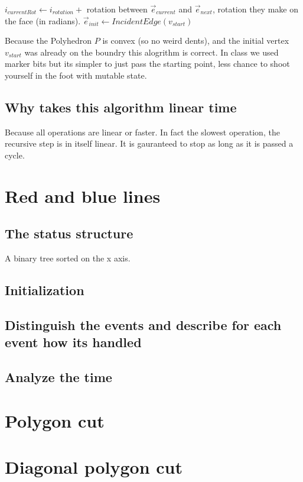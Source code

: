 \documentclass{article}
\begin{document}
\begin{empfile}
\begin{algorithmic}
	\State
	$i_{currentRot} \gets i_{rotation} + $ rotation between 
	$\vec{e}_{current}$ and $\vec{e}_{next}$, rotation they make on the 
	face (in radians).
		\State \Return {}
	\EndIf
	\State
	\Return {}
	\EndFunction
	\State
	\State $\vec{e}_{init} \gets IncidentEdge(v_{start})$
	\State
	\State \Return
	\EndFunction
	\State 
\end{algorithmic}

Because the Polyhedron $P$ is convex (so no weird dents), and
the initial vertex $v_{start}$ was already on the boundry this
alogrithm is correct.
In class we used marker bits but its simpler to just pass the
starting point, less chance to shoot yourself in the foot with
mutable state.

\subsection{Why takes this algorithm linear time}
Because all operations are linear or faster. In fact the slowest
operation, the recursive step is in itself linear. It is gauranteed to stop
as long as it is passed a cycle.

\section{Red and blue lines}
\subsection{The status structure}
A binary tree sorted on the x axis.
\subsection{Initialization}

\subsection{Distinguish the events and describe for each event how its handled}
\subsection{Analyze the time}
\section{Polygon cut}
\section{Diagonal polygon cut}
\end{empfile}
\end{document}

